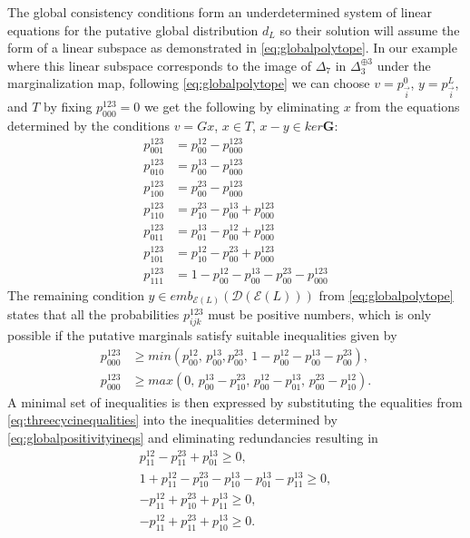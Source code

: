 The global consistency conditions form an underdetermined system of linear equations for the putative global distribution $d_{L}$ so their solution will assume the form of a linear subspace as demonstrated in \ref{eq:globalpolytope}.  In our example where this linear subspace corresponds to the image of $\Delta_7$ in $\Delta_3^{\oplus 3}$ under the marginalization map, following \ref{eq:globalpolytope} we can choose $v=p^0_{\vec{i}}$, $y=p^L_{\vec{i}}$, and $T$ by fixing $p^{123}_{000}=0$ we get the following by eliminating $x$ from the equations determined by the conditions $v=Gx$, $x \in T$, $x-y \in ker \mathbf{G}$:
\begin{equation}
\begin{aligned}\label{eq:globalpositivityeqs}
p^{123}_{001} &= p^{12}_{00} - p^{123}_{000} \\
p^{123}_{010} &= p^{13}_{00} - p^{123}_{000} \\
p^{123}_{100} &= p^{23}_{00} - p^{123}_{000} \\
p^{123}_{110} &= p^{23}_{10} - p^{13}_{00} + p^{123}_{000} \\
p^{123}_{011} &= p^{13}_{01} - p^{12}_{00} + p^{123}_{000} \\
p^{123}_{101} &= p^{12}_{10} - p^{23}_{00} + p^{123}_{000} \\
p^{123}_{111} &= 1 - p^{12}_{00} - p^{13}_{00} - p^{23}_{00} - p^{123}_{000}
\end{aligned}
\end{equation}
The remaining condition $y \in emb_{\mathcal{E}(L)}(\mathcal{D}(\mathcal{E}(L)))$ from \ref{eq:globalpolytope} states that all the probabilities $p^{123}_{ijk}$ must be positive numbers, which is only possible if the putative marginals satisfy suitable inequalities given by
\begin{equation}
\begin{aligned}\label{eq:globalpositivityineqs}
p^{123}_{000} &\geq min(p^{12}_{00},\, p^{13}_{00},p^{23}_{00},\, 1 - p^{12}_{00} - p^{13}_{00} - p^{23}_{00}),\\
 p^{123}_{000} &\geq max(0,\, p^{13}_{00}-p^{23}_{10},\, p^{12}_{00}-p^{13}_{01},\, p^{23}_{00}-p^{12}_{10}).
\end{aligned}
\end{equation}
A minimal set of inequalities is then expressed by substituting the equalities from \ref{eq:threecycinequalities} into the inequalities determined by \ref{eq:globalpositivityineqs} and eliminating redundancies resulting in
\begin{equation}
\begin{aligned}\label{eq:threecycbooleinequalities}
p^{12}_{11} - p^{23}_{11} + p^{13}_{01} \geq 0, \\
1 + p^{12}_{11} - p^{23}_{10} - p^{13}_{10} - p^{13}_{01} - p^{13}_{11} \geq 0, \\
-p^{12}_{11} + p^{23}_{10} + p^{13}_{11} \geq 0, \\
-p^{12}_{11} + p^{23}_{11} + p^{13}_{10} \geq 0.
\end{aligned}
\end{equation}
